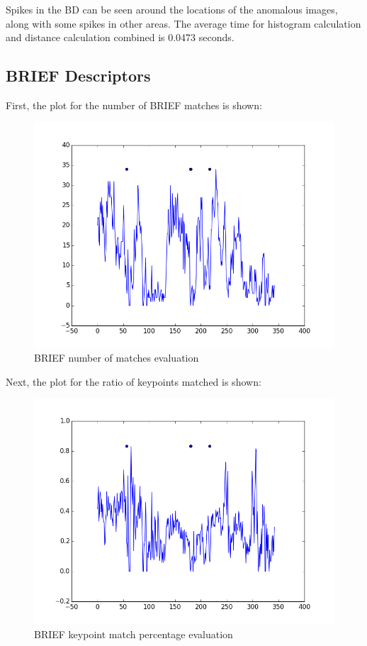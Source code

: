 Spikes in the BD can be seen around the locations of the anomalous images, along with some spikes in other areas.
The average time for histogram calculation and distance calculation combined is 0.0473 seconds.

\subsection{BRIEF Descriptors}

First, the plot for the number of BRIEF matches is shown:

\begin{figure}[h]
\centering
\includegraphics[scale=.50]{figures/611nummatchestest}
\caption{BRIEF number of matches evaluation}
\label{fig:tamu-fig3}
\end{figure}

Next, the plot for the ratio of keypoints matched is shown:

\begin{figure}[h]
\centering
\includegraphics[scale=.50]{figures/611matchratiostest}
\caption{BRIEF keypoint match percentage evaluation}
\label{fig:tamu-fig3}
\end{figure}

